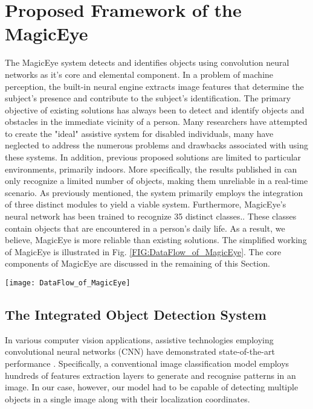 \documentclass[journal,12pt,onecolumn,letterpaper]{IEEEtran}
\begin{document}
\section{Proposed Framework of the MagicEye}
\label{Sec:Proposed_Framework}

The MagicEye system detects and identifies objects using convolution neural networks as it's core and elemental component. In a problem of machine perception, the built-in neural engine extracts image features that determine the subject's presence and contribute to the subject's identification. The primary objective of existing solutions has always been to detect and identify objects and obstacles in the immediate vicinity of a person. Many researchers have attempted to create the "ideal" assistive system for disabled individuals, many have neglected to address the numerous problems and drawbacks associated with using these systems. In addition, previous proposed solutions are limited to particular environments, primarily indoors. More specifically, the results published in \cite{afif_evaluation_2020, khan_ai-based_2020, joshi_yolo-v3_2020, dascalu_usability_2017, shahira_obstacle_2019-1} can only recognize a limited number of objects, making them unreliable in a real-time scenario. As previously mentioned, the system primarily employs the integration of three distinct modules to yield a viable system. Furthermore, MagicEye's neural network has been trained to recognize 35 distinct classes.. These classes contain objects that are encountered in a person's daily life. As a result, we believe, MagicEye is more reliable than existing solutions. The simplified working of MagicEye is illustrated in Fig. \ref{FIG:DataFlow_of_MagicEye}. The core components of MagicEye are discussed in the remaining of this Section.

\begin{figure*}[htbp]
\centering
\texttt{[image: DataFlow\_of\_MagicEye]}
\caption{The Data Flow is the MagicEye.}
\label{FIG:DataFlow_of_MagicEye}
\end{figure*}


\subsection{The Integrated Object Detection System}

In various computer vision applications, assistive technologies employing convolutional neural networks (CNN) have demonstrated state-of-the-art performance \cite{real_navigation_2019}. Specifically, a conventional image classification model employs hundreds of features extraction layers to generate and recognise patterns in an image. In our case, however, our model had to be capable of detecting multiple objects in a single image along with their localization coordinates. 
\end{document}
